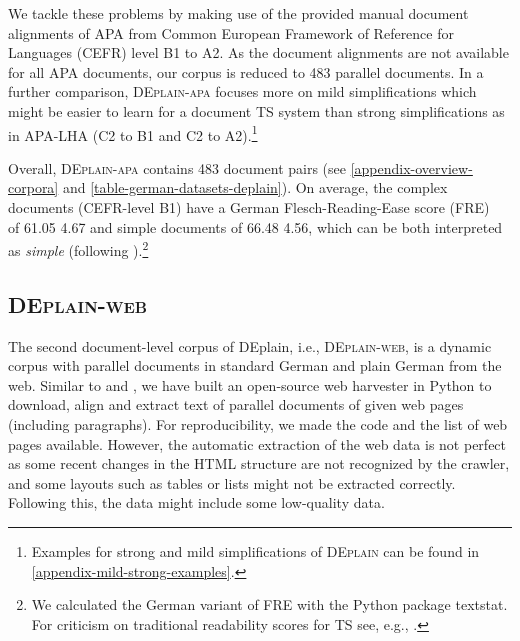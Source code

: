 \documentclass[11pt]{article}
\begin{document}
We tackle these problems by making use of the provided manual document alignments of APA from Common European Framework of Reference for Languages (CEFR) level B1 to A2. As the document alignments are not available for all APA documents, our corpus is reduced to 483 parallel documents. In a further comparison, \textsc{DEplain-apa} focuses more on mild simplifications which might be easier to learn for a document TS system than strong simplifications as in APA-LHA (C2 to B1 and C2 to A2).\footnote{Examples for strong and mild simplifications of \textsc{DEplain} can be found in \autoref{appendix-mild-strong-examples}.}

Overall, \textsc{DEplain-apa} contains 483 document pairs (see \autoref{appendix-overview-corpora} and \autoref{table-german-datasets-deplain}). On average, the complex documents (CEFR-level B1) have a German Flesch-Reading-Ease score (FRE)~\cite{flesch-1948-new,amstad-1978-verstandlich} of 61.05  4.67 and simple documents of 66.48  4.56, which can be both interpreted as \textit{simple} (following \citet[p. 117]{amstad-1978-verstandlich}).\footnote{We calculated the German variant of FRE with the Python package textstat.  For criticism on traditional readability scores for TS see, e.g., \citet{tanprasert-kauchak-2021-flesch}.}



\subsection{\textsc{DEplain-web}}
\label{sec-deplain-web}
The second document-level corpus of DEplain, i.e., \textsc{DEplain-web}, is a dynamic corpus with parallel documents in standard German and plain German from the web. Similar to \citet{battisti-etal-2020-corpus} and \citet{toborek-etal-2022-new}, we have built an open-source web harvester in Python to download, align and extract text of parallel documents of given web pages (including paragraphs). For reproducibility, we made the code and the list of web pages available.
However, the automatic extraction of the web data is not perfect as some recent changes in the HTML structure are not recognized by the crawler, and some layouts such as tables or lists might not be extracted correctly. Following this, the data might include some low-quality data.\par
\end{document}
